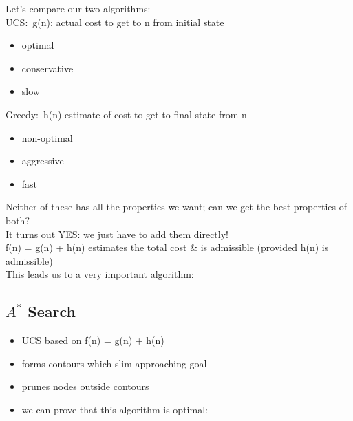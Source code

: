 \documentclass[../../lecture_notes.tex]{subfiles}
\begin{document}
\noindent Let’s compare our two algorithms:\\
\indent UCS:\
	\indent g(n): actual cost to get to n from initial state
	\begin{itemize} [itemsep=0mm]
		\item optimal
		\item conservative
		\item slow
	\end{itemize}
\indent Greedy:\
        \indent h(n) estimate of cost to get to final state from n
        \begin{itemize} [itemsep=0mm]
		\item non-optimal
		\item aggressive
		\item fast
	\end{itemize}
\noindent Neither of these has all the properties we want; can we get the best properties of both?\\
It turns out YES: we just have to add them directly!\\
\indent f(n) = g(n) + h(n) estimates the total cost \& is admissible (provided h(n) is admissible)\\
This leads us to a very important algorithm:

\subsection*{$A^*$ Search}
\begin{itemize}[itemsep=0mm]
	\item UCS based on f(n) = g(n) + h(n)
	\item forms contours which slim approaching goal
	\item prunes nodes outside contours
	\item we can prove that this algorithm is optimal:
\end{itemize} \medskip
\end{document}
